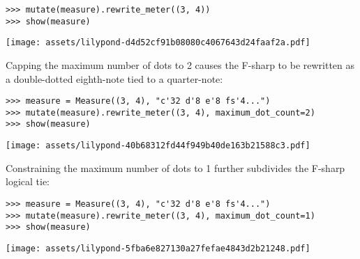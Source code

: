 \begin{comment}
<abjad>
mutate(measure).rewrite_meter((3, 4))
show(measure)
</abjad>
\end{comment}

\begin{abjadbookoutput}
\begin{singlespacing}
\vspace{-0.5\baselineskip}
\begin{verbatim}
>>> mutate(measure).rewrite_meter((3, 4))
>>> show(measure)
\end{verbatim}
\noindent\texttt{[image: assets/lilypond-d4d52cf91b08080c4067643d24faaf2a.pdf]}
\end{singlespacing}
\end{abjadbookoutput}

\noindent Capping the maximum number of dots to 2 causes the F-sharp to be
rewritten as a double-dotted eighth-note tied to a quarter-note:

\begin{comment}
<abjad>
measure = Measure((3, 4), "c'32 d'8 e'8 fs'4...")
mutate(measure).rewrite_meter((3, 4), maximum_dot_count=2)
show(measure)
</abjad>
\end{comment}

\begin{abjadbookoutput}
\begin{singlespacing}
\vspace{-0.5\baselineskip}
\begin{verbatim}
>>> measure = Measure((3, 4), "c'32 d'8 e'8 fs'4...")
>>> mutate(measure).rewrite_meter((3, 4), maximum_dot_count=2)
>>> show(measure)
\end{verbatim}
\noindent\texttt{[image: assets/lilypond-40b68312fd44f949b40de163b21588c3.pdf]}
\end{singlespacing}
\end{abjadbookoutput}

\noindent Constraining the maximum number of dots to 1 further subdivides the
F-sharp logical tie:

\begin{comment}
<abjad>
measure = Measure((3, 4), "c'32 d'8 e'8 fs'4...")
mutate(measure).rewrite_meter((3, 4), maximum_dot_count=1)
show(measure)
</abjad>
\end{comment}

\begin{abjadbookoutput}
\begin{singlespacing}
\vspace{-0.5\baselineskip}
\begin{verbatim}
>>> measure = Measure((3, 4), "c'32 d'8 e'8 fs'4...")
>>> mutate(measure).rewrite_meter((3, 4), maximum_dot_count=1)
>>> show(measure)
\end{verbatim}
\noindent\texttt{[image: assets/lilypond-5fba6e827130a27fefae4843d2b21248.pdf]}
\end{singlespacing}
\end{abjadbookoutput}

